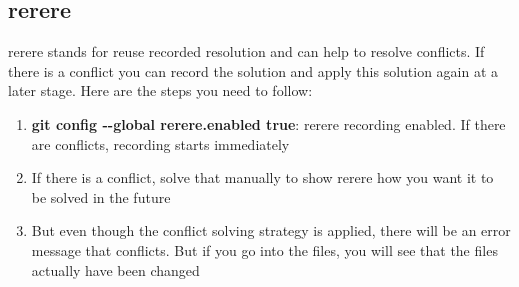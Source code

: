 \documentclass[12pt]{article}
\begin{document}
\subsection{rerere}
rerere stands for reuse recorded resolution and can help to resolve conflicts. If there is a conflict you can record the solution and apply this solution again at a later stage. Here are the steps you need to follow:
\begin{enumerate}
\item \textbf{git config \textrm{-}\textrm{-}global rerere.enabled true}: rerere recording enabled. If there are conflicts, recording starts immediately
\item If there is a conflict, solve that manually to show rerere how you want it to be solved in the future 
\item But even though the conflict solving strategy is applied, there will be an error message that conflicts. But if you go into the files, you will see that the files actually have been changed
\end{enumerate}
\end{document}
